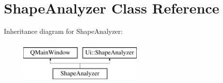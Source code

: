 \hypertarget{class_shape_analyzer}{}\section{Shape\+Analyzer Class Reference}
\label{class_shape_analyzer}
Inheritance diagram for Shape\+Analyzer\+:\begin{figure}[H]
\begin{center}
\leavevmode
\includegraphics[height=2.000000cm]{class_shape_analyzer}
\end{center}
\end{figure}
